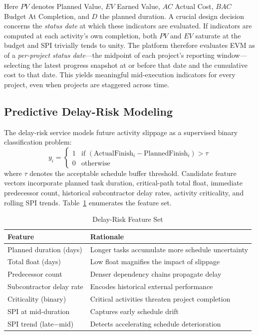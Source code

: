 \documentclass[conference]{IEEEtran}
\begin{document}
Here \(PV\) denotes Planned Value, \(EV\) Earned Value, \(AC\) Actual Cost, \(BAC\) Budget At Completion, and \(D\) the planned duration. A crucial design decision concerns the \emph{status date} at which these indicators are evaluated. If indicators are computed at each activity's own completion, both \(PV\) and \(EV\) saturate at the budget and SPI trivially tends to unity. The platform therefore evaluates EVM as of a \emph{per-project status date}---the midpoint of each project's reporting window---selecting the latest progress snapshot at or before that date and the cumulative cost to that date. This yields meaningful mid-execution indicators for every project, even when projects are staggered across time.

\subsection{Predictive Delay-Risk Modeling}

The delay-risk service models future activity slippage as a supervised binary classification problem:
\begin{equation}
y_i = \begin{cases} 1 & \text{if } (\text{ActualFinish}_i - \text{PlannedFinish}_i) > \tau \\ 0 & \text{otherwise} \end{cases}
\label{eq:label}
\end{equation}
where \(\tau\) denotes the acceptable schedule buffer threshold. Candidate feature vectors incorporate planned task duration, critical-path total float, immediate predecessor count, historical subcontractor delay rates, activity criticality, and rolling SPI trends. Table~\ref{tab:features} enumerates the feature set.

\begin{table}[t]
\caption{Delay-Risk Feature Set}
\label{tab:features}
\centering
\footnotesize
\begin{tabular}{@{}p{3.0cm}p{3.4cm}@{}}
\toprule
\textbf{Feature} & \textbf{Rationale} \\
\midrule
Planned duration (days) & Longer tasks accumulate more schedule uncertainty \\
Total float (days) & Low float magnifies the impact of slippage \\
Predecessor count & Denser dependency chains propagate delay \\
Subcontractor delay rate & Encodes historical external performance \\
Criticality (binary) & Critical activities threaten project completion \\
SPI at mid-duration & Captures early schedule drift \\
SPI trend (late$-$mid) & Detects accelerating schedule deterioration \\
\bottomrule
\end{tabular}
\end{table}
\end{document}

